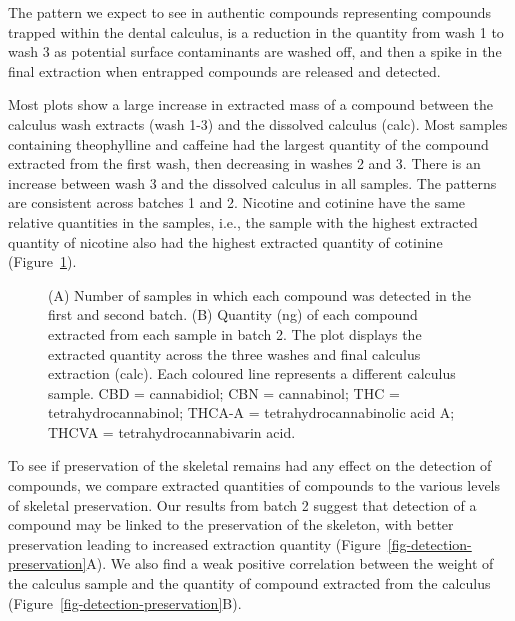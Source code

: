 \documentclass[
]{article}
\begin{document}
The pattern we expect to see in authentic compounds representing
compounds trapped within the dental calculus, is a reduction in the
quantity from wash 1 to wash 3 as potential surface contaminants are
washed off, and then a spike in the final extraction when entrapped
compounds are released and detected.

Most plots show a large increase in extracted mass of a compound between
the calculus wash extracts (wash 1-3) and the dissolved calculus (calc).
Most samples containing theophylline and caffeine had the largest
quantity of the compound extracted from the first wash, then decreasing
in washes 2 and 3. There is an increase between wash 3 and the dissolved
calculus in all samples. The patterns are consistent across batches 1
and 2. Nicotine and cotinine have the same relative quantities in the
samples, i.e., the sample with the highest extracted quantity of
nicotine also had the highest extracted quantity of cotinine
(Figure~\ref{fig-auth-plot-batch2}).

\begin{figure}


\caption{\label{fig-auth-plot-batch2}(A) Number of samples in which each
compound was detected in the first and second batch. (B) Quantity (ng)
of each compound extracted from each sample in batch 2. The plot
displays the extracted quantity across the three washes and final
calculus extraction (calc). Each coloured line represents a different
calculus sample. CBD = cannabidiol; CBN = cannabinol; THC =
tetrahydrocannabinol; THCA-A = tetrahydrocannabinolic acid A; THCVA =
tetrahydrocannabivarin acid.}

\end{figure}%

To see if preservation of the skeletal remains had any effect on the
detection of compounds, we compare extracted quantities of compounds to
the various levels of skeletal preservation. Our results from batch 2
suggest that detection of a compound may be linked to the preservation
of the skeleton, with better preservation leading to increased
extraction quantity (Figure~\ref{fig-detection-preservation}A). We also
find a weak positive correlation between the weight of the calculus
sample and the quantity of compound extracted from the calculus
(Figure~\ref{fig-detection-preservation}B).
\end{document}
